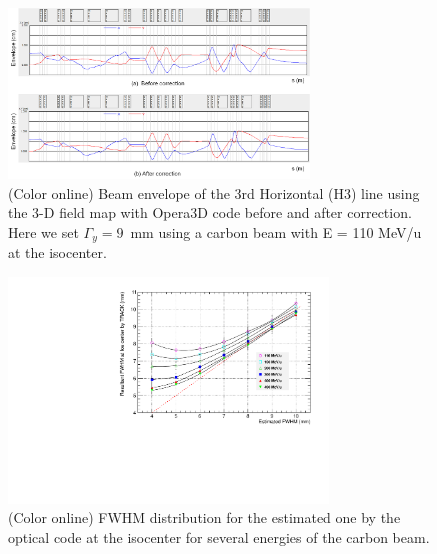 \documentclass[jkps,preprint,fleqn,showpacs,showkeys]{revtex4}
\begin{document}
\begin{figure}[h]
  \begin{center}
    \includegraphics[width=8.0cm]{Fig06.png}    
    \caption{(Color online) Beam envelope of the 3rd Horizontal (H3) line using the 3-D field map with Opera3D code before and after correction.
      Here we set $\Gamma_{y} = 9$~mm using a carbon beam with E = 110 MeV/u at the isocenter.}
    \label{fig5}
  \end{center}
\end{figure}
\begin{figure}[h]
  \begin{center}
    \includegraphics[width=8.5cm]{Fig06-1.pdf}    
    \caption{(Color online) FWHM distribution for the estimated one by the optical code at the isocenter
      for several energies of the carbon beam.}
    \label{fig6}
  \end{center}
\end{figure}
\end{document}
